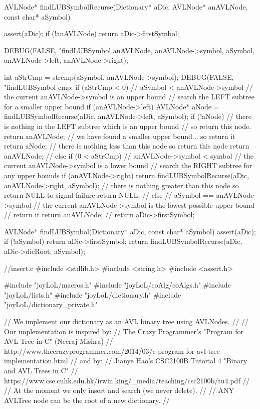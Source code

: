 AVLNode* findLUBSymbolRecurse(Dictionary* aDic,
                              AVLNode* anAVLNode,
                              const char* aSymbol) {
  assert(aDic);
  if (!anAVLNode) return aDic->firstSymbol;

  DEBUG(FALSE, "findLUBSymbol %
        anAVLNode, anAVLNode->symbol, aSymbol,
        anAVLNode->left, anAVLNode->right);

  int aStrCmp = strcmp(aSymbol, anAVLNode->symbol);
  DEBUG(FALSE, "findLUBSymbol cmp: %
  if (aStrCmp < 0) {
    // aSymbol < anAVLNode->symbol
    // the current anAVLNode->symbol is an upper bound
    // search the LEFT subtree for a smaller upper bound
    if (anAVLNode->left) {
      AVLNode* aNode = findLUBSymbolRecurse(aDic, anAVLNode->left, aSymbol);
      if (!aNode) {
        // there is nothing in the LEFT subtree which is an upper bound
        // so return this node.
        return anAVLNode;
      }
      // we have found a smaller upper bound... so return it
      return aNode;
    }
    // there is nothing less than this node so return this node
    return anAVLNode;
    //
  } else if (0 < aStrCmp) {
    // anAVLNode->symbol < symbol
    // the current anAVLNode->symbol is a lower bound
    // search the RIGHT subtree for any upper bounds
    if (anAVLNode->right) {
      return findLUBSymbolRecurse(aDic, anAVLNode->right, aSymbol);
    }
    // there is nothing greater than this node so return NULL to signal failure
    return NULL;
    //
  } else {
    // aSymbol == anAVLNode->symbol
    // the current anAVLNode->symbol is the lowest possible upper bound
    // return it
    return anAVLNode;
    //
  }
  return aDic->firstSymbol;
}

AVLNode* findLUBSymbol(Dictionary* aDic, const char* aSymbol) {
  assert(aDic);
  if (!aSymbol) return aDic->firstSymbol;
  return findLUBSymbolRecurse(aDic, aDic->dicRoot, aSymbol);
}

\stoptyping

\starttyping
//insert.c
#include <stdlib.h>
#include <string.h>
#include <assert.h>

#include "joyLoL/macros.h"
#include "joyLoL/coAlg/coAlgs.h"
#include "joyLoL/lists.h"
#include "joyLoL/dictionary.h"
#include "joyLoL/dictionary_private.h"

// We implement our dictionary as an AVL binary tree using AVLNodes.
//
// Our implementation is inspired by:
// The Crazy Programmer's "Program for AVL Tree in C" (Neeraj Mishra)
// http://www.thecrazyprogrammer.com/2014/03/c-program-for-avl-tree-implementation.html
// and by:
// Jianye Hao's CSC2100B Tutorial 4 "Binary and AVL Trees in C"
// https://www.cse.cuhk.edu.hk/irwin.king/_media/teaching/csc2100b/tu4.pdf
//
// At the moment we only insert and search (we never delete).
//
// ANY AVLTree node can be the root of a new dictionary.
//

